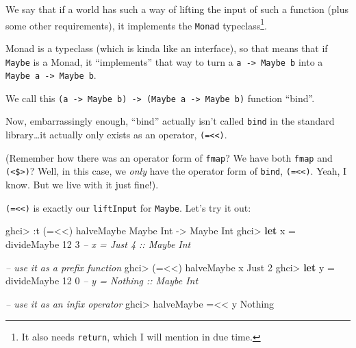 \documentclass[]{article}
\newenvironment{Shaded}{}{}
\newcommand{\CommentTok}[1]{\textcolor[rgb]{0.38,0.63,0.69}{\textit{#1}}}
\newcommand{\DataTypeTok}[1]{\textcolor[rgb]{0.56,0.13,0.00}{#1}}
\newcommand{\DecValTok}[1]{\textcolor[rgb]{0.25,0.63,0.44}{#1}}
\newcommand{\FunctionTok}[1]{\textcolor[rgb]{0.02,0.16,0.49}{#1}}
\newcommand{\KeywordTok}[1]{\textcolor[rgb]{0.00,0.44,0.13}{\textbf{#1}}}
\newcommand{\NormalTok}[1]{#1}
\newcommand{\OtherTok}[1]{\textcolor[rgb]{0.00,0.44,0.13}{#1}}
\begin{document}
We say that if a world has such a way of lifting the input of such a function
(plus some other requirements), it implements the \texttt{Monad}
typeclass\footnote{It also needs \texttt{return}, which I will mention in due
  time.}.

Monad is a typeclass (which is kinda like an interface), so that means that if
\texttt{Maybe} is a Monad, it ``implements'' that way to turn a
\texttt{a\ -\textgreater{}\ Maybe\ b} into a
\texttt{Maybe\ a\ -\textgreater{}\ Maybe\ b}.

We call this
\texttt{(a\ -\textgreater{}\ Maybe\ b)\ -\textgreater{}\ (Maybe\ a\ -\textgreater{}\ Maybe\ b)}
function ``bind''.

Now, embarrassingly enough, ``bind'' actually isn't called \texttt{bind} in the
standard library\ldots{}it actually only exists as an operator,
\texttt{(=\textless{}\textless{})}.

(Remember how there was an operator form of \texttt{fmap}? We have both
\texttt{fmap} and \texttt{(\textless{}\$\textgreater{})}? Well, in this case, we
\emph{only} have the operator form of \texttt{bind},
\texttt{(=\textless{}\textless{})}. Yeah, I know. But we live with it just
fine!).

\texttt{(=\textless{}\textless{})} is exactly our \texttt{liftInput} for
\texttt{Maybe}. Let's try it out:

\begin{Shaded}
\begin{Highlighting}[]
\NormalTok{ghci}\FunctionTok{>} \FunctionTok{:}\NormalTok{t (}\FunctionTok{=<<}\NormalTok{) halveMaybe}
\DataTypeTok{Maybe} \DataTypeTok{Int} \OtherTok{->} \DataTypeTok{Maybe} \DataTypeTok{Int}
\NormalTok{ghci}\FunctionTok{>} \KeywordTok{let}\NormalTok{ x }\FunctionTok{=}\NormalTok{ divideMaybe }\DecValTok{12} \DecValTok{3}     \CommentTok{-- x = Just 4 :: Maybe Int}

\CommentTok{-- use it as a prefix function}
\NormalTok{ghci}\FunctionTok{>}\NormalTok{ (}\FunctionTok{=<<}\NormalTok{) halveMaybe x}
\DataTypeTok{Just} \DecValTok{2}
\NormalTok{ghci}\FunctionTok{>} \KeywordTok{let}\NormalTok{ y }\FunctionTok{=}\NormalTok{ divideMaybe }\DecValTok{12} \DecValTok{0}     \CommentTok{-- y = Nothing :: Maybe Int}

\CommentTok{-- use it as an infix operator}
\NormalTok{ghci}\FunctionTok{>}\NormalTok{ halveMaybe }\FunctionTok{=<<}\NormalTok{ y}
\DataTypeTok{Nothing}
\end{Highlighting}
\end{Shaded}
\end{document}

